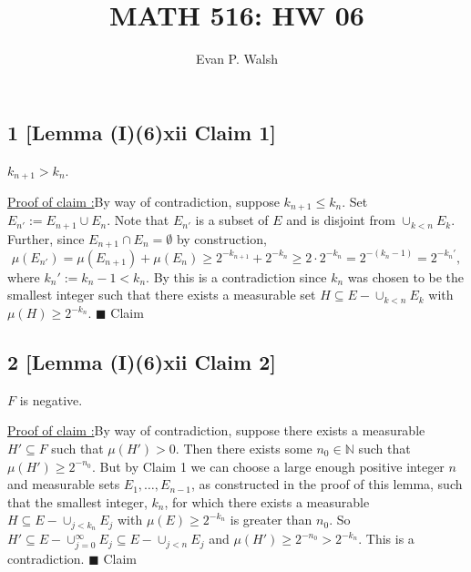 \documentclass[12pt]{article}
\title{MATH 516: HW 06}
\author{Evan P. Walsh}
\newcounter{ProofCounter}
\newcounter{ClaimCounter}[ProofCounter]
\newenvironment{claimproof}[1]{\par\noindent\underline{Proof of claim \theClaimCounter:}\space#1}{\hfill $\blacksquare$ Claim \theClaimCounter}
\begin{document}
\maketitle

\subsection*{1 [Lemma (I)(6)xii Claim 1]}
\begin{tcolorbox}
$k_{n+1} > k_{n}$.
\end{tcolorbox}
\begin{claimproof}
By way of contradiction, suppose $k_{n+1} \leq k_{n}$. Set $E_{n'} := E_{n+1}\cup E_{n}$. Note that $E_{n'}$ is a subset of $E$ and is 
disjoint from $\cup_{k < n}E_{k}$. Further, since $E_{n+1}\cap E_{n} = \emptyset$ by construction,
\[ \mu(E_{n'}) = \mu(E_{n+1}) + \mu(E_{n}) \geq 2^{-k_{n+1}}  + 2^{-k_n}\geq 2\cdot 2^{-k_{n}} = 2^{-(k_{n}-1)} = 2^{-k_{n}'}, \]
where $k_{n}' := k_{n} - 1 < k_{n}$. By this is a contradiction since $k_{n}$ was chosen to be the smallest integer such that there exists a 
measurable set $H \subseteq E - \cup_{k < n}E_{k}$ with $\mu(H) \geq 2^{-k_{n}}$.
\end{claimproof}



\subsection*{2 [Lemma (I)(6)xii Claim 2]}
\begin{tcolorbox}
$F$ is negative.
\end{tcolorbox}
\begin{claimproof}
By way of contradiction, suppose there exists a measurable $H' \subseteq F$ such that $\mu(H') > 0$. Then there exists some $n_{0} \in \mathbb{N}$ such that 
$\mu(H') \geq 2^{-n_{0}}$. But by Claim 1 we can choose a large enough positive integer $n$ and measurable sets $E_1, \hdots, E_{n-1}$, as constructed 
in the proof of this lemma, such that the smallest integer, $k_n$, for which there exists a measurable $H \subseteq E - \cup_{j < k_n}E_j$ with $\mu(E)
\geq 2^{-k_n}$ is greater than $n_0$. So $H' \subseteq E - \cup_{j=0}^{\infty}E_j \subseteq E - \cup_{j < n}E_j$ and $\mu(H') \geq 2^{-n_0} >
2^{-k_n}$. This is a contradiction.
\end{claimproof}


\newpage
\end{document}
